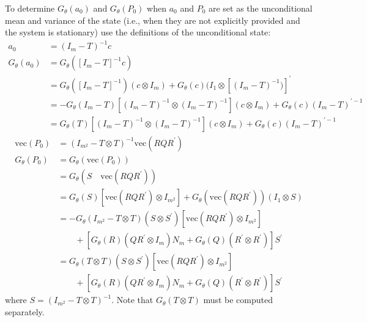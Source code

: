 \documentclass[12pt]{article}
\newcommand{\Gt}{G_\theta}
\newcommand{\vecop}[0]{\text{vec}}
\begin{document}
To determine $\Gt(a_0)$ and $\Gt(P_0)$ when $a_0$ and $P_0$ are set as the unconditional mean and variance of the state (i.e., when they are not explicitly provided and the system is stationary) use the definitions of the unconditional state:
\begin{align*}
a_0 &= (I_m - T)^{-1} c \\
\Gt(a_0) &= \Gt([I_m - T]^{-1} c) \\ 
	&= \Gt([I_m - T]^{-1}) (c \otimes I_m) + \Gt(c) (I_1 \otimes [(I_m - T)^{-1})]^\prime \\ 
	&= -\Gt(I_m - T) [(I_m - T)^{-1} \otimes (I_m - T)^{-1} ](c \otimes I_m) +  \Gt(c) (I_m - T)^{\prime-1} \\ 
	&= \Gt(T) [(I_m - T)^{-1} \otimes (I_m - T)^{-1}] (c \otimes I_m) +  \Gt(c) (I_m - T)^{\prime-1} 
\end{align*}
\begin{align*}
\vecop(P_0) &= (I_{m^2} - T \otimes T)^{-1} \vecop(RQR^\prime) \\ 
\Gt(P_0) &= \Gt(\vecop(P_0)) \\
	&= \Gt(S  \quad \vecop(RQR^\prime))\\
	&= \Gt(S) [\vecop(RQR^\prime) \otimes I_{m^2}] + \Gt(\vecop(RQR^\prime))(I_1 \otimes S) \\
	&= -\Gt(I_{m^2} - T \otimes T)(S \otimes S^\prime) [\vecop(RQR^\prime) \otimes I_{m^2}]\\ 
	&\qquad + [\Gt(R)(QR^\prime \otimes I_m) N_m + \Gt(Q)(R^\prime \otimes R^\prime)] S^\prime \\
	&= \Gt(T \otimes T)(S \otimes S^\prime) [\vecop(RQR^\prime) \otimes I_{m^2}] \\
	&\qquad + [\Gt(R)(QR^\prime \otimes I_m) N_m + \Gt(Q)(R^\prime \otimes R^\prime)] S^\prime
\end{align*}
where $S = (I_{m^2} - T \otimes T)^{-1}$. Note that $\Gt(T \otimes T)$ must be computed separately.


\end{document}
